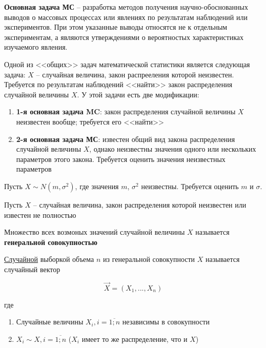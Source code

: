 \textbf{Основная задача МС} -- разработка методов получения
научно-обоснованных выводов о массовых процессах или явлениях
по результатам наблюдений или экспериментов. При этом указанные выводы
относятся не к отдельным экспериментам, а являются утверждениями о
вероятностых характеристиках изучаемого явления.

Одной из <<общих>> задач математической статистики является следующая
задача: $X$ -- случайная величина, закон распрееления которой
неизвестен. Требуется по результатам наблюдений <<найти>> закон
распределения случайной величины $X$. У этой задачи есть две модификации:

\begin{enumerate}
    \item \textbf{1-я основная задача MC}: закон распределения случайной
        величины $X$ неизвестен вообще; требуется его <<найти>>
    \item \textbf{2-я основная задача МС}: известен общий вид закона
        распределения случайной величины $X$, однако неизвестны значения
        одного или нескольких параметров этого закона. Требуется
        оценить значения неизвестных параметров
\end{enumerate}

\begin{example}
    Пусть $X \sim N(m, \sigma^2)$, где значения $m$, $\sigma^2$
    неизвестны. Требуется оценить $m$ и $\sigma$.
\end{example}

\begin{defenition}
    Пусть $X$ -- случайная величина, закон распределения которой
    неизвестен или известен не полностью

    Множество всех возмоных значений случайной величины $X$ называется
    \textbf{генеральной совокупностью}
\end{defenition}

\begin{defenition}
    \underline{Случайной} выборкой объема $n$ из генеральной совокупности
    $X$ называется случайный вектор

    \begin{equation*}
        \vec X = (X_1, ..., X_n)
    \end{equation*}

    где

    \begin{enumerate}
        \item Случайные величины $X_i, i = \overline{1;n}$ независимы
            в совокупности
        \item $X_i \sim X, i = \overline{1;n}$ ($X_i$ имеет то же
            распределение, что и $X$)
    \end{enumerate}
\end{defenition}

